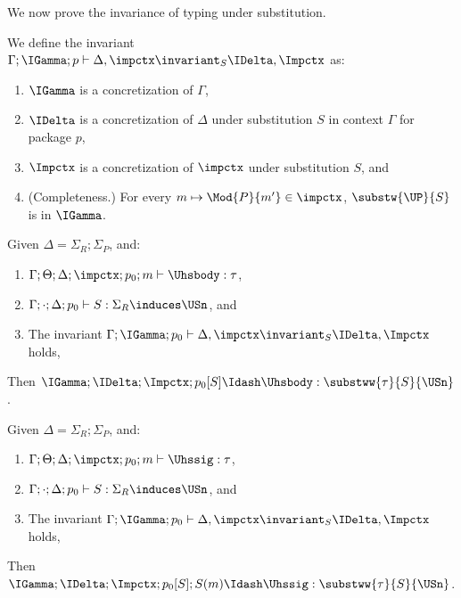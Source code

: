 We now prove the invariance of typing under substitution.

\begin{definition}
We define the invariant $\Gamma; \IGamma; p \vdash \Delta, \impctx \invariant_S \IDelta, \Impctx$ as:
\begin{enumerate}
\item $\IGamma$ is a concretization of $\Gamma$,
\item $\IDelta$ is a concretization of $\Delta$ under substitution $S$ in context $\Gamma$ for package $p$,
\item $\Impctx$ is a concretization of $\impctx$ under substitution $S$, and
\item (Completeness.) For every $m \mapsto \Mod{P}{m'} \in \impctx$, $\substw{\UP}{S}$ is in $\IGamma$.
\end{enumerate}
\end{definition}

\begin{axiom}
Given $\Delta = \Sigma_R; \Sigma_P$, and:
\begin{enumerate}
\item $\Gamma; \Theta; \Delta; \impctx; p_0; m \vdash \Uhsbody : \tau$,
\item $\Gamma; \cdot; \Delta; p_0 \vdash S : \Sigma_R \induces \USn$, and
\item The invariant $\Gamma; \IGamma; p_0 \vdash \Delta, \impctx \invariant_S \IDelta, \Impctx$ holds,
\end{enumerate}
Then $\IGamma; \IDelta; \Impctx; p_0[S] \Idash \Uhsbody : \substww{\tau}{S}{\USn}$.
\end{axiom}

\begin{axiom}
Given $\Delta = \Sigma_R; \Sigma_P$, and:
\begin{enumerate}
\item $\Gamma; \Theta; \Delta; \impctx; p_0; m \vdash \Uhssig : \tau$,
\item $\Gamma; \cdot; \Delta; p_0 \vdash S : \Sigma_R  \induces \USn$, and
\item The invariant $\Gamma; \IGamma; p_0 \vdash \Delta, \impctx \invariant_S \IDelta, \Impctx$ holds,
\end{enumerate}
Then $\IGamma; \IDelta; \Impctx; p_0[S]; S(m) \Idash \Uhssig : \substww{\tau}{S}{\USn}$.
\end{axiom}

